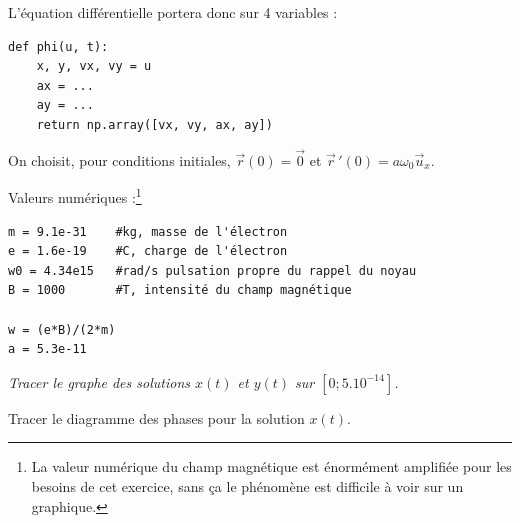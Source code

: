 \newpage
L'équation différentielle portera donc sur 4 variables :
\begin{lstlisting}
def phi(u, t):
    x, y, vx, vy = u
    ax = ...
    ay = ...
    return np.array([vx, vy, ax, ay])
\end{lstlisting}


On choisit, pour conditions initiales, $\vec{r}(0)=\vec{0}$ 
et $\vec{r}\,'(0)=a\omega_0\vec{u}_x$.

Valeurs numériques :\footnote{La valeur numérique du champ magnétique est énormément amplifiée pour les besoins de cet exercice, sans ça le phénomène est difficile à voir sur un graphique.}
\begin{lstlisting}
m = 9.1e-31    #kg, masse de l'électron
e = 1.6e-19    #C, charge de l'électron
w0 = 4.34e15   #rad/s pulsation propre du rappel du noyau
B = 1000       #T, intensité du champ magnétique

w = (e*B)/(2*m)
a = 5.3e-11
\end{lstlisting}
\begin{Exercise}\it
Tracer le graphe des solutions $x(t)$ et $y(t)$ sur $[0; 5.10^{-14}]$.

Tracer le diagramme des phases pour la solution $x(t)$.
\end{Exercise}
